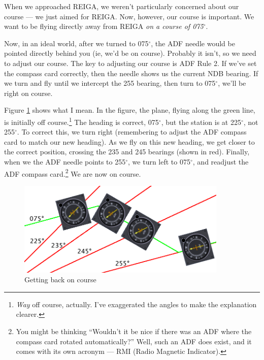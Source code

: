%
%
%

When we approached REIGA, we weren't particularly concerned about our
course --- we just aimed for REIGA.  Now, however, our course is
important.  We want to be flying directly away from REIGA \emph{on a
  course of 075$^\circ$}.

Now, in an ideal world, after we turned to 075$^\circ$, the ADF needle
would be pointed directly behind you (ie, we'd be on course).
Probably it isn't, so we need to adjust our course.  The key to
adjusting our course is ADF Rule 2.  If we've set the compass card
correctly, then the needle shows us the current NDB bearing.  If we
turn and fly until we intercept the 255 bearing, then turn to
075$^\circ$, we'll be right on course.

Figure \ref{fig:NDB_flying} shows what I mean.  In the figure, the
plane, flying along the green line, is initially off
course.\footnote{\emph{Way} off course, actually.  I've exaggerated
  the angles to make the explanation clearer.}  The heading is
correct, 075$^\circ$, but the station is at 225$^\circ$, not
255$^\circ$.  To correct this, we turn right (remembering to adjust
the ADF compass card to match our new heading).  As we fly on this new
heading, we get closer to the correct position, crossing the 235 and
245 bearings (shown in red).  Finally, when we the ADF needle points
to 255$^\circ$, we turn left to 075$^\circ$, and readjust the ADF
compass card.\footnote{You might be thinking ``Wouldn't it be nice if
  there was an ADF where the compass card rotated automatically?''
  Well, such an ADF does exist, and it comes with its own acronym ---
  RMI (Radio Magnetic Indicator).} We are now on course.

\begin{figure}
  \begin{center}
    \includegraphics[width=10cm]{img/NDB_flying}
    \caption{Getting back on course}
    \label{fig:NDB_flying}
  \end{center}
\end{figure}

